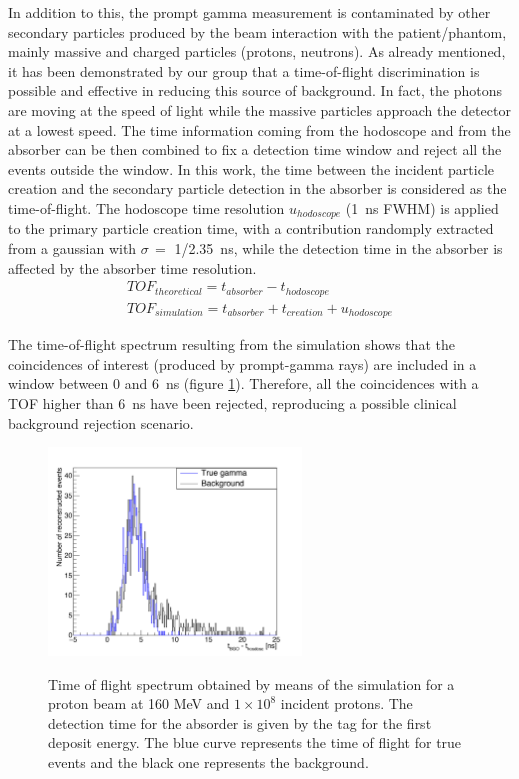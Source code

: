 In addition to this, the prompt gamma measurement is contaminated by other secondary particles produced by the beam interaction with the patient/phantom, mainly massive and charged particles (protons, neutrons). 
As already mentioned, it has been demonstrated by our group that a time-of-flight discrimination is possible and effective in reducing this source of background. In fact, the photons are moving at the speed of light while the massive particles approach the detector at a lowest speed. The time information coming from the hodoscope and from the absorber can be then combined to fix a detection time window and reject all the events outside the window. In this work, the time between the incident particle creation and the secondary particle detection in the absorber is considered as the time-of-flight. The hodoscope time resolution $u_{hodoscope}$ (1~ns FWHM) is applied to the primary particle creation time, with a contribution randomply extracted from a gaussian with $\sigma\,=$ 1/2.35~ns, while the detection time in the absorber is affected by the absorber time resolution.\\
 \begin{eqnarray}
TOF_{theoretical} = t_{absorber}-t_{hodoscope} \\
TOF_{simulation} = t_{absorber}+t_{creation} + u_{hodoscope}
\label{TOF_equation}
\end{eqnarray} 

The time-of-flight spectrum resulting from the simulation shows that the coincidences of interest (produced by prompt-gamma rays) are included in a window between 0 and 6~ns (figure \ref{fig:fig_TOF_distribution_CC_simulation_Hadronth}). Therefore, all the coincidences with a TOF higher than 6~ns have been rejected, reproducing a possible clinical background rejection scenario. 

	\begin{figure} [!hbtp]	
	\centering
	\caption{Time of flight spectrum obtained by means of the simulation for a proton beam at 160 MeV and $1\times10^{8}$ incident protons. The detection time for the absorder is given by the tag for the first deposit energy. The blue curve represents the time of flight for true events and the black one represents the background.}	
	\includegraphics[width=0.6\textwidth]{./Figure/2015_01_04_TOF_spectra_NoCut_1Proton_ResolTemporelle_applied_these.jpg}
	\label{fig:fig_TOF_distribution_CC_simulation_Hadronth}
	\end{figure}

